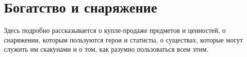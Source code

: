 \chapter{Богатство и снаряжение}
Здесь подробно рассказывается о купле-продаже предметов и ценностей, о снаряжении, которым пользуются герои и статисты, о существах, которые могут служить им скакунами и о том, как разумно пользоваться всем этим.










